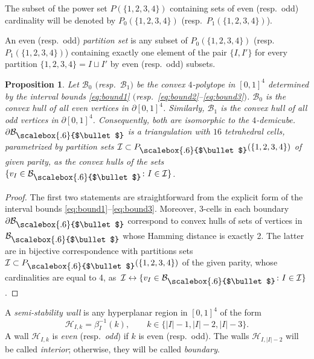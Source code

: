 \documentclass[pdftex]{sigma}
\newcommand\sbul[1][.6]{\mathbin{\vcenter{\hbox{\scalebox{#1}{$\bullet$}}}}}
\newcommand{\qB}{\mathcal{B}}
\newcommand{\qH}{\mathcal{H}}
\newcommand{\qI}{\mathcal{I}}
\numberwithin{equation}{section}
\newtheorem{Proposition}[Theorem]{Proposition}
 { \theoremstyle{definition}
\newtheorem{Definition}[Theorem]{Definition}
\newtheorem{Note}[Theorem]{Note}
\newtheorem{Example}[Theorem]{Example}
\newtheorem{Remark}[Theorem]{Remark} }
\begin{document}
The subset of the power set $P(\{1,2,3,4\})$ containing sets of even (resp.~odd) cardinality will be denoted by $P_{0}(\{1,2,3,4\})$ (resp.~$P_{1}(\{1,2,3,4\})$).

{\sloppy\begin{Definition}
An even (resp.~odd) \textit{partition set} is any subset of $P_{0}(\{1,2,3,4\})$ (resp. $P_{1}(\{1,2,3,4\})$) containing exactly one element of the pair $\{I,I'\}$ for every partition $\{1,2,3,4\}=I\sqcup I'$ by even (resp.~odd) subsets.
\end{Definition}}

\begin{Proposition} \label{prop:W-hull}
Let $\qB_{0}$ $($resp.~$\qB_{1})$ be the convex $4$-polytope in $[0,1]^{4}$ determined by the interval bounds \eqref{eq:bound1} $($resp.~\eqref{eq:bound2}--\eqref{eq:bound3}$)$.
$\qB_{0}$ is the convex hull of all even vertices in $\partial [0,1]^{4}$. Similarly, $\qB_{1}$ is the convex hull of all odd vertices in $\partial [0,1]^{4}$. Consequently, both are isomorphic to the $4$-demicube. $\partial\qB_{\sbul}$ is a triangulation with $16$ tetrahedral cells, parametrized by partition sets $\qI\subset P_{\sbul}(\{1,2,3,4\})$ of given parity, as the convex hulls of the sets $\{v_{I}\in\qB_{\sbul}\colon I\in\qI\}$.
\end{Proposition}

\begin{proof}
The first two statements are straightforward from the explicit form of the interval bounds \eqref{eq:bound1}--\eqref{eq:bound3}.
Moreover, 3-cells in each boundary $\partial\qB_{\sbul}$ correspond to convex hulls of sets of vertices in $\qB_{\sbul}$ whose Hamming distance is exactly 2. The latter are in bijective correspondence with partitions sets $\qI\subset P_{\sbul}(\{1,2,3,4\})$ of the given parity, whose cardinalities are equal to 4, as~$\qI \leftrightarrow \{v_{I}\in\qB_{\sbul}\colon I\in\qI\}$.
\end{proof}


\begin{Definition}
A \emph{semi-stability wall} is any hyperplanar region in $[0,1]^{4}$ of the form
\[
\qH_{I,k}= \beta_{I}^{-1}(k),\qquad k\in\{\vert I\vert -1, \vert I\vert -2, \vert I\vert -3\}.
\]
A wall $\qH_{I,k}$ is \emph{even} (resp.~\emph{odd}) if $k$ is even (resp.~odd). The walls $\qH_{I,\vert I\vert -2}$ will be called \emph{interior}; otherwise, they will be called \emph{boundary}.
\end{Definition}
\end{document}
